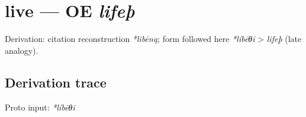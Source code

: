 \documentclass[
  british,
  a4paper,
  openany]{book}
\providecommand{\texorpdfstring}[2]{#1}
\begin{document}
\section{\texorpdfstring{live --- OE
\emph{lifeþ}}{live --- OE lifeþ}}\label{live-oe-lifeuxfe}


Derivation: citation reconstruction \emph{*libēną}; form followed here
\emph{*líbēθi} \textgreater{} \emph{lifeþ} (late analogy).

\subsection{Derivation trace}\label{derivation-trace-117}

Proto input: \emph{*líbēθi}

\begingroup
\setlength{\fboxsep}{6pt}
\end{document}
